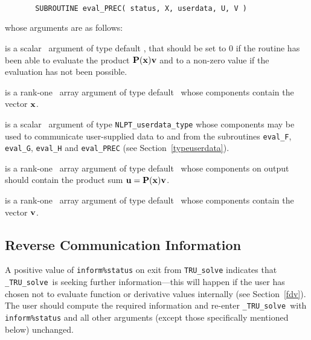 \documentclass{galahad}
\newcommand{\packagename}{TRU}
\newcommand{\fullpackagename}{\libraryname\_\packagename}
\newcommand{\solver}{{\tt \fullpackagename\_solve}}
\begin{document}
\def\baselinestretch{0.8}
{\tt
\begin{verbatim}
       SUBROUTINE eval_PREC( status, X, userdata, U, V )
\end{verbatim} }
\def\baselinestretch{1.0}
\noindent whose arguments are as follows:

\begin{description}
 is a scalar \intentout\ argument of type default \integer,
that should be set to 0 if the routine has been able to evaluate the
product ${\mathbf{P}}({\mathbf{x}}) {\mathbf{v}}$
and to a non-zero value if the evaluation has not been possible.

 is a rank-one \intentin\ array argument of type default \realdp\
whose components contain the vector ${\mathbf{x}}$.

 is a scalar \intentinout\ argument of type
{\tt NLPT\_userdata\_type} whose components may be used
to communicate user-supplied data to and from the
subroutines {\tt eval\_F}, {\tt eval\_G},
{\tt eval\_H} and {\tt eval\_PREC}
(see Section~\ref{typeuserdata}).

 is a rank-one \intentout\ array argument of type default \realdp\
whose components on output should contain the product
sum ${\mathbf{u}} = {\mathbf{P}}({\mathbf{x}}) {\mathbf{v}}$.

 is a rank-one \intentin\ array argument of type default \realdp\
whose components contain the vector ${\mathbf{v}}$.

\end{description}


\subsection{\label{reverse}Reverse Communication Information}

A positive value of {\tt inform\%status} on exit from
{\tt \packagename\_solve}
indicates that
\solver\ is seeking further information---this will happen
if the user has chosen not to evaluate function or
derivative values internally (see Section~\ref{fdv}).
The user should compute the required information and re-enter \solver\
with {\tt inform\%status} and all other arguments (except those specifically
mentioned below) unchanged.
\end{document}
